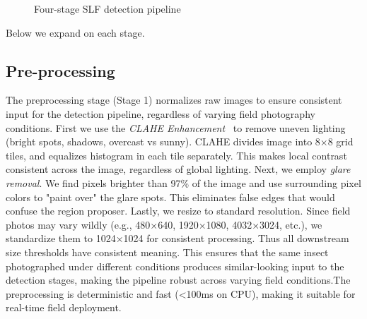 \documentclass[11pt, a4paper]{article}
\begin{document}
\begin{figure}[htpb]
{
}
\caption{Four-stage SLF detection pipeline}
\label{fig:pipeline}
\end{figure}

Below we expand on each stage.

\subsection{Pre-processing}
The preprocessing stage (Stage 1) normalizes raw 
images to ensure consistent input for the detection pipeline, regardless of varying field photography conditions. First we 
use the \emph{CLAHE Enhancement}~\cite{clahe} to remove uneven 
lighting (bright spots, shadows, overcast vs sunny). CLAHE divides image into 8×8 grid tiles, and equalizes histogram in 
each tile separately. This makes local contrast consistent across the image, 
regardless of global lighting. Next, we employ \emph{glare removal}. We find pixels brighter than 97\% of the image and use surrounding 
pixel colors to "paint over" the glare spots. This eliminates false edges that would confuse the region proposer. Lastly, we resize to 
standard resolution. Since field photos may vary 
wildly (e.g., 480×640, 1920×1080, 4032×3024, etc.), we standardize them to 1024×1024 for consistent processing. Thus 
all downstream size thresholds have consistent meaning. This ensures that the same insect photographed under different 
conditions produces similar-looking input to the detection stages, making the pipeline robust across varying field conditions.The 
preprocessing is deterministic and fast (<100ms on CPU), making it suitable for real-time field deployment.
\end{document}
